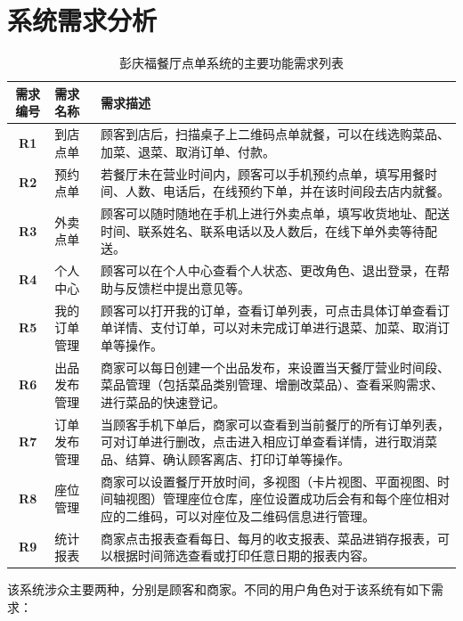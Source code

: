 \section{系统需求分析}
\begin{table}[htbp!]\footnotesize
  \centering
  \caption{彭庆福餐厅点单系统的主要功能需求列表}
  \vspace{2mm}
  \begin{tabular}{clp{}}
  \toprule
  \textbf{需求编号}&\textbf{需求名称}&\textbf{需求描述}\\
  \midrule 
  \textbf{R1}& 到店点单& 顾客到店后，扫描桌子上二维码点单就餐，可以在线选购菜品、加菜、退菜、取消订单、付款。\\
  \hline
  \textbf{R2}& 预约点单& 若餐厅未在营业时间内，顾客可以手机预约点单，填写用餐时间、人数、电话后，在线预约下单，并在该时间段去店内就餐。\\
  \hline
  \textbf{R3}& 外卖点单& 顾客可以随时随地在手机上进行外卖点单，填写收货地址、配送时间、联系姓名、联系电话以及人数后，在线下单外卖等待配送。\\
  \hline
  \textbf{R4}& 个人中心& 顾客可以在个人中心查看个人状态、更改角色、退出登录，在帮助与反馈栏中提出意见等。\\
  \hline
  \textbf{R5}& 我的订单管理& 顾客可以打开我的订单，查看订单列表，可点击具体订单查看订单详情、支付订单，可以对未完成订单进行退菜、加菜、取消订单等操作。\\
  \hline
  \textbf{R6}& 出品发布管理& 商家可以每日创建一个出品发布，来设置当天餐厅营业时间段、菜品管理（包括菜品类别管理、增删改菜品）、查看采购需求、进行菜品的快速登记。\\
  \hline
  \textbf{R7}& 订单发布管理& 当顾客手机下单后，商家可以查看到当前餐厅的所有订单列表，可对订单进行删改，点击进入相应订单查看详情，进行取消菜品、结算、确认顾客离店、打印订单等操作。\\
  \hline
  \textbf{R8}& 座位管理& 商家可以设置餐厅开放时间，多视图（卡片视图、平面视图、时间轴视图）管理座位仓库，座位设置成功后会有和每个座位相对应的二维码，可以对座位及二维码信息进行管理。\\
  \hline
  \textbf{R9}& 统计报表& 商家点击报表查看每日、每月的收支报表、菜品进销存报表，可以根据时间筛选查看或打印任意日期的报表内容。\\
  \bottomrule
  \end{tabular}
  \label{table:requireList}
\end{table}

该系统涉众主要两种，分别是顾客和商家。不同的用户角色对于该系统有如下需求：

